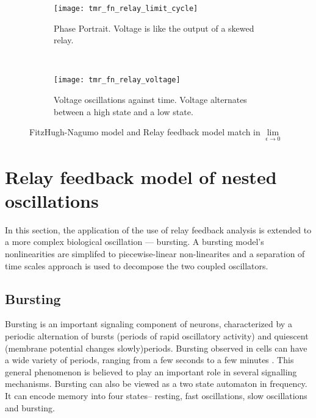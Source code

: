 \documentclass[a4paper, 12pt]{article}
\begin{document}
\begin{figure}[h!]
    \centering
    \begin{subfigure}[t]{0.45\textwidth}
        \texttt{[image: tmr\_fn\_relay\_limit\_cycle]}
        \caption{Phase Portrait. Voltage is like the output of a skewed relay.}
        \label{fig:f_n_relay_limit_cycle}
    \end{subfigure}
    ~ %
    \begin{subfigure}[t]{0.45\textwidth}
        \texttt{[image: tmr\_fn\_relay\_voltage]}
        \caption{Voltage oscillations against time. Voltage alternates between a high state and a low state.}
        \label{fig:f_n_relay_voltage}
    \end{subfigure}
\caption{FitzHugh-Nagumo model and Relay feedback model match in $\lim\limits_{\epsilon\to 0}$}
\label{fig:matching_fitz_relay}
\end{figure}

\FloatBarrier


\section{Relay feedback model of nested oscillations}\label{Sec:nested oscillations}
In this section, the application of the use of relay feedback analysis is extended to a more complex biological oscillation --- bursting. A bursting model's nonlinearities are simplifed to piecewise-linear non-linearites and a separation of time scales approach is used to decompose the two coupled oscillators. 

\subsection{Bursting}
Bursting is an important signaling component of neurons, characterized by a periodic alternation of bursts (periods of rapid oscillatory activity) and quiescent (membrane potential changes slowly)periods\cite{franci2}. Bursting observed in cells can have a wide variety of periods, ranging from a few seconds to a few minutes \cite{keener}. This general phenomenon is believed to play an important role in several signalling mechanisms. Bursting can also be viewed as a two state automaton in frequency. It can encode memory into four states-- resting, fast oscillations, slow oscillations and bursting. 
\end{document}
